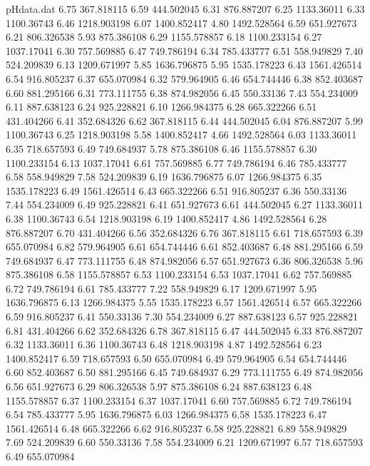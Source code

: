 \begin{filecontents}{pHdata.dat}
6.75 	367.818115
6.59 	444.502045
6.31 	876.887207
6.25 	1133.36011
6.33 	1100.36743
6.46 	1218.903198
6.07 	1400.852417
4.80 	1492.528564
6.59 	651.927673
6.21 	806.326538
5.93 	875.386108
6.29 	1155.578857
6.18 	1100.233154
6.27 	1037.17041
6.30 	757.569885
6.47 	749.786194
6.34 	785.433777
6.51 	558.949829
7.40 	524.209839
6.13 	1209.671997
5.85 	1636.796875
5.95 	1535.178223
6.43 	1561.426514
6.54 	916.805237
6.37 	655.070984
6.32 	579.964905
6.46 	654.744446
6.38 	852.403687
6.60 	881.295166
6.31 	773.111755
6.38 	874.982056
6.45 	550.33136
7.43 	554.234009
6.11 	887.638123
6.24 	925.228821
6.10 	1266.984375
6.28 	665.322266
6.51 	431.404266
6.41 	352.684326
6.62 	367.818115
6.44 	444.502045
6.04 	876.887207
5.99 	1100.36743
6.25 	1218.903198
5.58 	1400.852417
4.66 	1492.528564
6.03 	1133.36011
6.35 	718.657593
6.49 	749.684937
5.78 	875.386108
6.46 	1155.578857
6.30 	1100.233154
6.13 	1037.17041
6.61 	757.569885
6.77 	749.786194
6.46 	785.433777
6.58 	558.949829
7.58 	524.209839
6.19 	1636.796875
6.07 	1266.984375
6.35 	1535.178223
6.49 	1561.426514
6.43 	665.322266
6.51 	916.805237
6.36 	550.33136
7.44 	554.234009
6.49 	925.228821
6.41 	651.927673
6.61 	444.502045
6.27 	1133.36011
6.38 	1100.36743
6.54 	1218.903198
6.19 	1400.852417
4.86 	1492.528564
6.28 	876.887207
6.70 	431.404266
6.56 	352.684326
6.76 	367.818115
6.61 	718.657593
6.39 	655.070984
6.82 	579.964905
6.61 	654.744446
6.61 	852.403687
6.48 	881.295166
6.59 	749.684937
6.47 	773.111755
6.48 	874.982056
6.57 	651.927673
6.36 	806.326538
5.96 	875.386108
6.58 	1155.578857
6.53 	1100.233154
6.53 	1037.17041
6.62 	757.569885
6.72 	749.786194
6.61 	785.433777
7.22 	558.949829
6.17 	1209.671997
5.95 	1636.796875
6.13 	1266.984375
5.55 	1535.178223
6.57 	1561.426514
6.57 	665.322266
6.59 	916.805237
6.41 	550.33136
7.30 	554.234009
6.27 	887.638123
6.57 	925.228821
6.81 	431.404266
6.62 	352.684326
6.78 	367.818115
6.47 	444.502045
6.33 	876.887207
6.32 	1133.36011
6.36 	1100.36743
6.48 	1218.903198
4.87 	1492.528564
6.23 	1400.852417
6.59 	718.657593
6.50 	655.070984
6.49 	579.964905
6.54 	654.744446
6.60 	852.403687
6.50 	881.295166
6.45 	749.684937
6.29 	773.111755
6.49 	874.982056
6.56 	651.927673
6.29 	806.326538
5.97 	875.386108
6.24 	887.638123
6.48 	1155.578857
6.37 	1100.233154
6.37 	1037.17041
6.60 	757.569885
6.72 	749.786194
6.54 	785.433777
5.95 	1636.796875
6.03 	1266.984375
6.58 	1535.178223
6.47 	1561.426514
6.48 	665.322266
6.62 	916.805237
6.58 	925.228821
6.89 	558.949829
7.69 	524.209839
6.60 	550.33136
7.58 	554.234009
6.21 	1209.671997
6.57 	718.657593
6.49 	655.070984

\end{filecontents}
